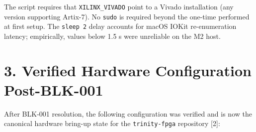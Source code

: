\begin{Shaded}
\begin{Highlighting}[]
\OperatorTok{=}
\OperatorTok{=}\VariableTok{$(}\KeywordTok{|}  \VariableTok{)}
     
 
\end{Highlighting}
\end{Shaded}

The script requires that \texttt{XILINX\_VIVADO}
point to a Vivado installation (any version
supporting Artix-7). No \texttt{sudo} is required
beyond the one-time
 performed at
first setup. The \texttt{sleep\ 2} delay accounts
for macOS IOKit re-enumeration latency;
empirically, values below 1.5 s were unreliable on
the M2 host.

\section{3. Verified Hardware Configuration
Post-BLK-001}\label{fa_33:verified-hardware-configuration-post-blk-001}

After BLK-001 resolution, the following
configuration was verified and is now the
canonical hardware bring-up state for the
\texttt{trinity-fpga} repository [2]:


